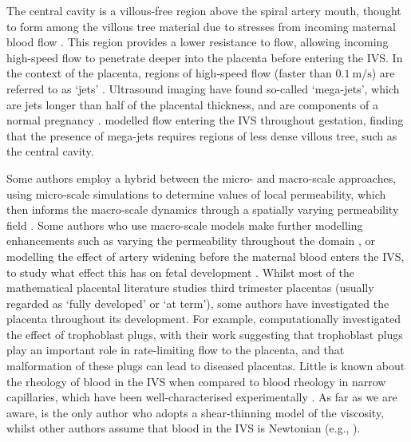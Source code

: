        The central cavity is a villous-free region above the spiral artery mouth, thought to form among the villous tree material due to stresses from incoming maternal blood flow \cite{burtonRheologicalPhysiologicalConsequences2009,saghianAssociationPlacentalJets2017}. This region provides a lower resistance to flow, allowing incoming high-speed flow to penetrate deeper into the placenta before entering the IVS. In the context of the placenta, regions of high-speed flow (faster than $\qty{0.1}{\metre\per\second}$) are referred to as `jets' \cite{saghianAssociationPlacentalJets2017}. Ultrasound imaging have found so-called `mega-jets', which are jets longer than half of the placental thickness, and are components of a normal pregnancy \cite{collinsDevelopmentalChangesSpiral2012}. \citeauthor{saghianAssociationPlacentalJets2017} \cite{saghianAssociationPlacentalJets2017} modelled flow entering the IVS throughout gestation, finding that the presence of mega-jets requires regions of less dense villous tree, such as the central cavity. 
        
        Some authors employ a hybrid between the micro- and macro-scale approaches, using micro-scale simulations to determine values of local permeability, which then informs the macro-scale dynamics through a spatially varying permeability field \cite{lecarpentierComputationalFluidDynamic2016,linMultiscaleModelPlacental2016}. Some authors who use macro-scale models make further modelling enhancements such as varying the permeability throughout the domain \cite{lecarpentierComputationalFluidDynamic2016,erianMaternalPlacentalBlood1977}, or modelling the effect of artery widening before the maternal blood enters the IVS, to study what effect this has on fetal development \cite{burtonRheologicalPhysiologicalConsequences2009,rothDynamicModelingUteroplacental2017,saghianAssociationPlacentalJets2017}. Whilst most of the mathematical placental literature studies third trimester placentas (usually regarded as `fully developed' or `at term'), some authors have investigated the placenta throughout its development. For example, \citeauthor{jamesTrophoblastPlugsImpact2018} \cite{jamesTrophoblastPlugsImpact2018} computationally investigated the effect of trophoblast plugs, with their work suggesting that trophoblast plugs play an important role in rate-limiting flow to the placenta, and that malformation of these plugs can lead to diseased placentas. Little is known about the rheology of blood in the IVS when compared to blood rheology in narrow capillaries, which have been well-characterised experimentally \cite{jensenBloodFlowTransport2019}. As far as we are aware, \citeauthor{lecarpentierComputationalFluidDynamic2016} \cite{lecarpentierComputationalFluidDynamic2016} is the only author who adopts a shear-thinning model of the viscosity, whilst other authors assume that blood in the IVS is Newtonian (e.g., \cite{chernyavskyMathematicalModelIntervillous2010,burtonRheologicalPhysiologicalConsequences2009,meklerImpactTissuePorosity2022}).

